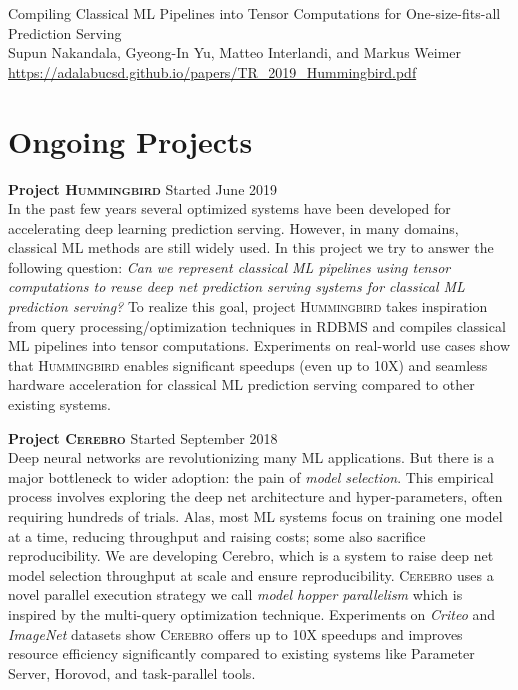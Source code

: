 \documentclass[margin]{res}
\begin{document}
\begin{resume}
\par
Compiling Classical ML Pipelines into Tensor Computations for One-size-fits-all Prediction Serving \\
Supun Nakandala, Gyeong-In Yu, Matteo Interlandi, and Markus Weimer\\
\url{https://adalabucsd.github.io/papers/TR_2019_Hummingbird.pdf}



\vspace{2mm}
\section{Ongoing Projects}
\par

\textbf{Project \textsc{Hummingbird}} \hfill Started June 2019\\
In the past few years several optimized systems have been developed for accelerating deep learning prediction serving. However, in many domains, classical ML methods are still widely used. In this project we try to answer the following question: \textit{Can we represent classical ML pipelines using tensor computations to reuse deep net prediction serving systems for classical ML prediction serving?} To realize this goal, project \textsc{Hummingbird} takes inspiration from query processing/optimization techniques in RDBMS and compiles classical ML pipelines into tensor computations. Experiments on real-world use cases show that \textsc{Hummingbird} enables significant speedups (even up to 10X)  and seamless hardware acceleration for classical ML prediction serving compared to other existing systems.


\textbf{Project \textsc{Cerebro}} \hfill Started September 2018\\
Deep neural networks are revolutionizing many ML applications.
But there is a major bottleneck to wider adoption: the pain of \textit{model selection}.
This empirical process involves exploring the deep net architecture and hyper-parameters, often requiring hundreds of trials.
Alas, most ML systems focus on training one model at a time, reducing throughput and raising costs; some also sacrifice reproducibility.
We are developing {Cerebro}, which is a system to raise deep net model selection throughput at scale and ensure reproducibility.
\textsc{Cerebro} uses a novel parallel execution strategy we call \textit{model hopper parallelism} which is inspired by the multi-query optimization technique.
Experiments on \textit{Criteo} and \textit{ImageNet} datasets show \textsc{Cerebro} offers up to 10X speedups and improves resource efficiency significantly compared to existing systems like Parameter Server, Horovod, and task-parallel tools.



\end{resume}
\end{document}
